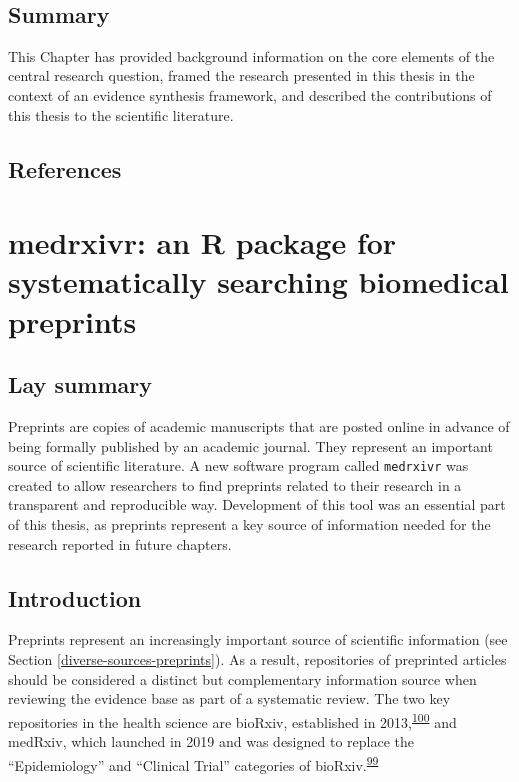 \documentclass[a4paper, twoside]{templates/ociamthesis}
\begin{document}
~

\hypertarget{summary}{%
\section{Summary}\label{summary}}

This Chapter has provided background information on the core elements of the central research question, framed the research presented in this thesis in the context of an evidence synthesis framework, and described the contributions of this thesis to the scientific literature.

\newpage

\hypertarget{references}{%
\section{References}\label{references}}



\hypertarget{sys-rev-tools-heading}{%
\chapter{medrxivr: an R package for systematically searching biomedical preprints}\label{sys-rev-tools-heading}}

\minitoc 

\hypertarget{lay-summary-1}{%
\section{Lay summary}\label{lay-summary-1}}

Preprints are copies of academic manuscripts that are posted online in advance of being formally published by an academic journal. They represent an important source of scientific literature. A new software program called \texttt{medrxivr} was created to allow researchers to find preprints related to their research in a transparent and reproducible way. Development of this tool was an essential part of this thesis, as preprints represent a key source of information needed for the research reported in future chapters.

\hypertarget{sys-rev-tools-intro}{%
\section{Introduction}\label{sys-rev-tools-intro}}

Preprints represent an increasingly important source of scientific information (see Section \ref{diverse-sources-preprints}). As a result, repositories of preprinted articles should be considered a distinct but complementary information source when reviewing the evidence base as part of a systematic review. The two key repositories in the health science are bioRxiv, established in 2013,\textsuperscript{\protect\hyperlink{ref-sever2019}{100}} and medRxiv, which launched in 2019 and was designed to replace the ``Epidemiology'' and ``Clinical Trial'' categories of bioRxiv.\textsuperscript{\protect\hyperlink{ref-rawlinson2019}{99}}
\end{document}
